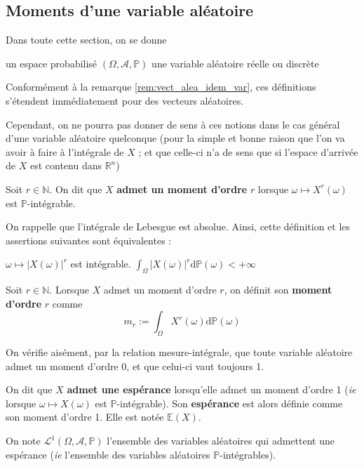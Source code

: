 \documentclass[../integ-proba.tex]{subfiles}
\begin{document}
\subsection{Moments d'une variable aléatoire}

Dans toute cette section, on se donne
\begin{itemize}
    \itemb un espace probabilisé $\left(\Omega, \mathcal{A}, \mathbb{P}\right)$
    \itemb une variable aléatoire réelle ou discrète
\end{itemize}

Conformément à la remarque \ref{rem:vect_alea_idem_var}, ces définitions s'étendent immédiatement pour des vecteurs aléatoires.

Cependant, on ne pourra pas donner de sens à ces notions dans le cas général d'une variable aléatoire quelconque (pour la simple et bonne raison que l'on va avoir à faire à l'intégrale de $X$ ; et que celle-ci n'a de sens que si l'espace d'arrivée de $X$ est contenu dans $\mathbb{R}^n$)

\begin{defi}
    Soit $r\in\mathbb{N}$. On dit que $X$ \textbf{admet un moment d'ordre} $r$ lorsque $\omega \mapsto X^r(\omega)$ est $\mathbb{P}$-intégrable.
\end{defi}

\begin{rem}
    On rappelle que l'intégrale de Lebesgue est absolue. Ainsi, cette définition et les assertions suivantes sont équivalentes :
    \begin{itemize}
        \itemb $\omega \mapsto \left|X(\omega)\right|^r$ est intégrable.
        \itemb $\displaystyle \int_\Omega\left|X(\omega)\right|^r\text{d}\mathbb{P}(\omega) < +\infty$
    \end{itemize}
\end{rem}

\begin{defi}
    Soit $r\in\mathbb{N}$. Lorsque $X$ admet un moment d'ordre $r$, on définit son \textbf{moment d'ordre } $r$ comme
    $$m_r := \int_\Omega X^r(\omega)\text{d}\mathbb{P}(\omega)$$
\end{defi}

\begin{rem}
    On vérifie aisément, par la relation mesure-intégrale, que toute variable aléatoire admet un moment d'ordre 0, et que celui-ci vaut toujours 1.
\end{rem}

\begin{defi}
    On dit que $X$ \textbf{admet une espérance} lorsqu'elle admet un moment d'ordre 1 (\textit{ie} lorsque $\omega \mapsto X\left(\omega\right)$ est $\mathbb{P}$-intégrable).
    Son \textbf{espérance} est alors définie comme son moment d'ordre 1.
    Elle est notée $\mathbb{E}(X)$.

    On note $\mathcal{L}^1\left(\Omega, \mathcal{A}, \mathbb{P}\right)$ l'ensemble des variables aléatoires qui admettent une espérance (\textit{ie} l'ensemble des variables aléatoires $\mathbb{P}$-intégrables).
\end{defi}
\end{document}
